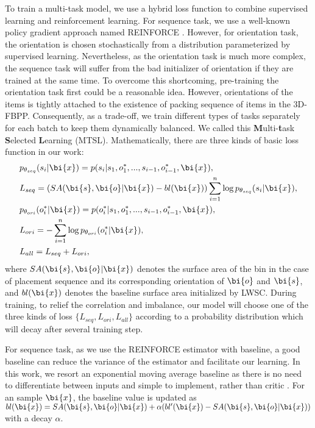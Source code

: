 To train a multi-task model, we use a hybrid loss function to combine supervised learning and reinforcement learning.
For sequence task, we use a well-known policy gradient approach named REINFORCE \cite{williams1992simple}. However, for orientation task, the orientation is chosen stochastically from a distribution parameterized by supervised learning. Nevertheless, as the orientation task is much more complex, the sequence task will suffer from the bad initializer of orientation if they are trained at the same time. To overcome this shortcoming, pre-training the orientation task first could be a reasonable idea.
However, orientations of the items is tightly attached to the existence of packing sequence of items in the 3D-FBPP. 
Consequently, as a trade-off, we train different types of tasks separately for each batch to keep them dynamically balanced.
We called this \textbf{M}ulti-\textbf{t}ask \textbf{S}elected \textbf{L}earning (MTSL). Mathematically, there are three kinds of basic loss function in our work:
\begin{eqnarray*}
	&p_{\theta_{seq}}(s_{i}|\bi{x}) = {p(s_{i}|s_{1},o_{1}^{*}, ..., s_{i-1}, o_{i-1}^{*}, \bi{x})},\\
	&L_{seq} = (SA(\bi{s},\bi{o}|\bi{x}) - bl(\bi{x}))\sum\limits_{i=1}^{n}\log{p_{\theta_{seq}}(s_{i}|\bi{x})},\\
	&p_{\theta_{ori}}(o_{i}^*|\bi{x}) = {p(o_{i}^*|s_{1},o_{1}^{*}, ..., s_{i-1}, o_{i-1}^{*}, \bi{x})},\\
	&L_{ori} = -\sum\limits_{i=1}^{n}\log{p_{\theta_{ori}}(o_{i}^*|\bi{x})},\\
	&L_{all}  = L_{seq} + L_{ori},
\end{eqnarray*}
where $SA(\bi{s},\bi{o}|\bi{x})$ denotes the surface area of the bin in the case of 
placement sequence and its corresponding orientation of $\bi{o}$ and $\bi{s}$, 
and $bl(\bi{x})$ denotes the baseline surface area initialized by LWSC. During training, to relief the correlation and imbalance, our model will choose one of the three kinds of loss $\{L_{seq}, L_{ori}, L_{all}\}$ according to a probability distribution which will decay after several training step.  

For sequence task, as we use the REINFORCE estimator with baseline, a good baseline can reduce the variance of the estimator and facilitate our learning. In this work, we resort an exponential moving average baseline as there is no need to differentiate between inputs and simple to implement, rather than critic \cite{degris2012off-policy}. For an sample $\bi{x}$, the baseline value is updated as $bl(\bi{x}) = SA(\bi{s},\bi{o}|\bi{x})+\alpha(bl'(\bi{x})-SA(\bi{s},\bi{o}|\bi{x}))$ with a decay $\alpha$.

